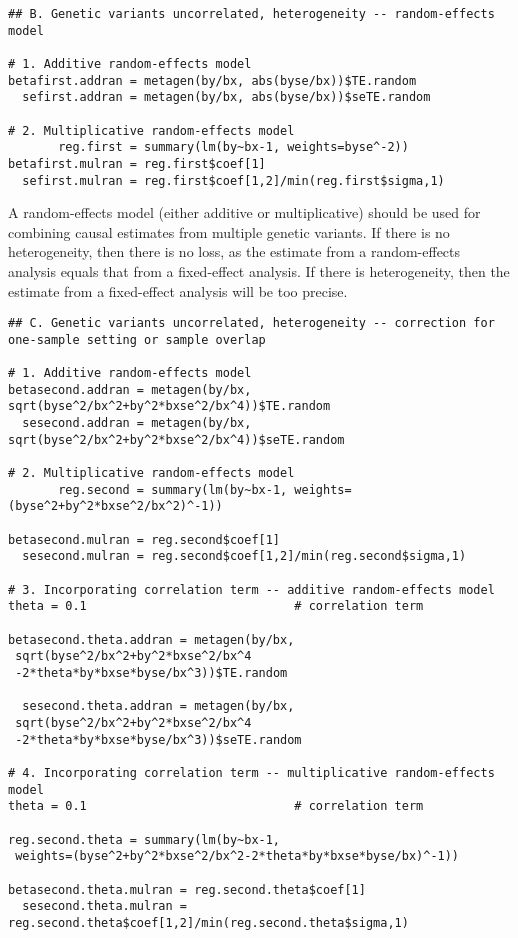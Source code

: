 \documentclass[a4paper,12pt]{article} %
\begin{document}
\begin{lstlisting}
## B. Genetic variants uncorrelated, heterogeneity -- random-effects model

# 1. Additive random-effects model
betafirst.addran = metagen(by/bx, abs(byse/bx))$TE.random
  sefirst.addran = metagen(by/bx, abs(byse/bx))$seTE.random

# 2. Multiplicative random-effects model
       reg.first = summary(lm(by~bx-1, weights=byse^-2))
betafirst.mulran = reg.first$coef[1]
  sefirst.mulran = reg.first$coef[1,2]/min(reg.first$sigma,1)
\end{lstlisting}

A random-effects model (either additive or multiplicative) should be used for combining causal estimates from multiple genetic variants. If there is no heterogeneity, then there is no loss, as the estimate from a random-effects analysis equals that from a fixed-effect analysis. If there is heterogeneity, then the estimate from a fixed-effect analysis will be too precise.

\begin{lstlisting}
## C. Genetic variants uncorrelated, heterogeneity -- correction for one-sample setting or sample overlap

# 1. Additive random-effects model
betasecond.addran = metagen(by/bx, sqrt(byse^2/bx^2+by^2*bxse^2/bx^4))$TE.random
  sesecond.addran = metagen(by/bx, sqrt(byse^2/bx^2+by^2*bxse^2/bx^4))$seTE.random

# 2. Multiplicative random-effects model
       reg.second = summary(lm(by~bx-1, weights=(byse^2+by^2*bxse^2/bx^2)^-1))

betasecond.mulran = reg.second$coef[1]
  sesecond.mulran = reg.second$coef[1,2]/min(reg.second$sigma,1)

# 3. Incorporating correlation term -- additive random-effects model
theta = 0.1                             # correlation term

betasecond.theta.addran = metagen(by/bx,
 sqrt(byse^2/bx^2+by^2*bxse^2/bx^4
 -2*theta*by*bxse*byse/bx^3))$TE.random

  sesecond.theta.addran = metagen(by/bx,
 sqrt(byse^2/bx^2+by^2*bxse^2/bx^4
 -2*theta*by*bxse*byse/bx^3))$seTE.random

# 4. Incorporating correlation term -- multiplicative random-effects model
theta = 0.1                             # correlation term

reg.second.theta = summary(lm(by~bx-1,
 weights=(byse^2+by^2*bxse^2/bx^2-2*theta*by*bxse*byse/bx)^-1))

betasecond.theta.mulran = reg.second.theta$coef[1]
  sesecond.theta.mulran = reg.second.theta$coef[1,2]/min(reg.second.theta$sigma,1)
\end{lstlisting}
\end{document}
